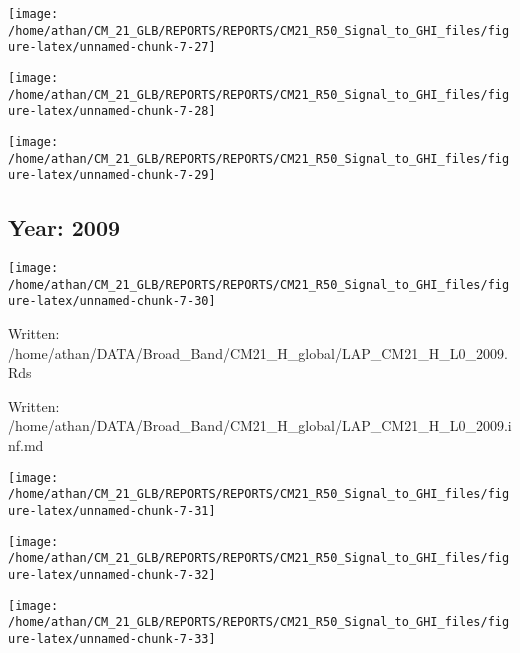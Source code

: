 \documentclass[
  11pt,
  a4paper,oneside]{article}
\begin{document}
\begin{center}\texttt{[image: /home/athan/CM\_21\_GLB/REPORTS/REPORTS/CM21\_R50\_Signal\_to\_GHI\_files/figure-latex/unnamed-chunk-7-27]} \end{center}

\begin{center}\texttt{[image: /home/athan/CM\_21\_GLB/REPORTS/REPORTS/CM21\_R50\_Signal\_to\_GHI\_files/figure-latex/unnamed-chunk-7-28]} \end{center}

\begin{center}\texttt{[image: /home/athan/CM\_21\_GLB/REPORTS/REPORTS/CM21\_R50\_Signal\_to\_GHI\_files/figure-latex/unnamed-chunk-7-29]} \end{center}

\FloatBarrier

\newpage

\hypertarget{year-2009}{%
\subsection{Year: 2009}\label{year-2009}}

\begin{center}\texttt{[image: /home/athan/CM\_21\_GLB/REPORTS/REPORTS/CM21\_R50\_Signal\_to\_GHI\_files/figure-latex/unnamed-chunk-7-30]} \end{center}

Written: /home/athan/DATA/Broad\_Band/CM21\_H\_global/LAP\_CM21\_H\_L0\_2009.Rds

Written: /home/athan/DATA/Broad\_Band/CM21\_H\_global/LAP\_CM21\_H\_L0\_2009.inf.md

\begin{center}\texttt{[image: /home/athan/CM\_21\_GLB/REPORTS/REPORTS/CM21\_R50\_Signal\_to\_GHI\_files/figure-latex/unnamed-chunk-7-31]} \end{center}

\begin{center}\texttt{[image: /home/athan/CM\_21\_GLB/REPORTS/REPORTS/CM21\_R50\_Signal\_to\_GHI\_files/figure-latex/unnamed-chunk-7-32]} \end{center}

\begin{center}\texttt{[image: /home/athan/CM\_21\_GLB/REPORTS/REPORTS/CM21\_R50\_Signal\_to\_GHI\_files/figure-latex/unnamed-chunk-7-33]} \end{center}
\end{document}
